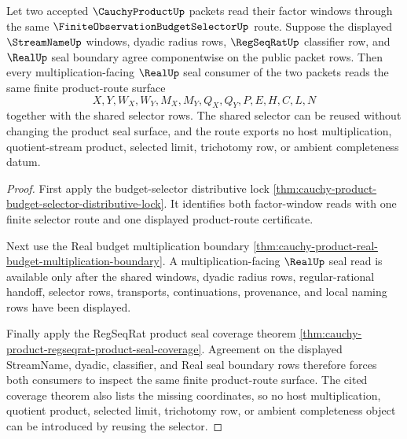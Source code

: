 \begin{theorem}
\label{thm:cauchy-product-shared-selector-real-seal-associativity}
Let two accepted $\CauchyProductUp$ packets read their factor windows through
the same $\FiniteObservationBudgetSelectorUp$ route. Suppose the displayed
$\StreamNameUp$ windows, dyadic radius rows, $\RegSeqRatUp$ classifier row, and
$\RealUp$ seal boundary agree componentwise on the public packet rows. Then
every multiplication-facing $\RealUp$ seal consumer of the two packets reads
the same finite product-route surface
$$
X,Y,W_X,W_Y,M_X,M_Y,Q_X,Q_Y,P,E,H,C,L,N
$$
together with the shared selector rows. The shared selector can be reused
without changing the product seal surface, and the route exports no host
multiplication, quotient-stream product, selected limit, trichotomy row, or
ambient completeness datum.
\end{theorem}
\begin{proof}
First apply the budget-selector distributive lock
\autoref{thm:cauchy-product-budget-selector-distributive-lock}. It identifies
both factor-window reads with one finite selector route and one displayed
product-route certificate.

Next use the Real budget multiplication boundary
\autoref{thm:cauchy-product-real-budget-multiplication-boundary}. A
multiplication-facing $\RealUp$ seal read is available only after the shared
windows, dyadic radius rows, regular-rational handoff, selector rows,
transports, continuations, provenance, and local naming rows have been
displayed.

Finally apply the RegSeqRat product seal coverage theorem
\autoref{thm:cauchy-product-regseqrat-product-seal-coverage}. Agreement on the
displayed StreamName, dyadic, classifier, and Real seal boundary rows therefore
forces both consumers to inspect the same finite product-route surface. The
cited coverage theorem also lists the missing coordinates, so no host
multiplication, quotient product, selected limit, trichotomy row, or ambient
completeness object can be introduced by reusing the selector.
\end{proof}

